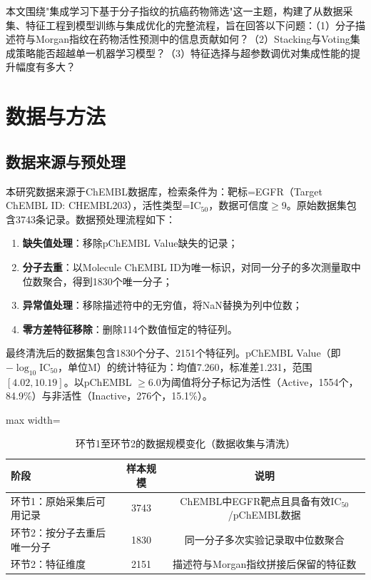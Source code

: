 \documentclass[12pt,a4paper]{article}
\begin{document}
本文围绕"集成学习下基于分子指纹的抗癌药物筛选"这一主题，构建了从数据采集、特征工程到模型训练与集成优化的完整流程，旨在回答以下问题：（1）分子描述符与Morgan指纹在药物活性预测中的信息贡献如何？（2）Stacking与Voting集成策略能否超越单一机器学习模型？（3）特征选择与超参数调优对集成性能的提升幅度有多大？

\section{数据与方法}

\subsection{数据来源与预处理}

本研究数据来源于ChEMBL数据库，检索条件为：靶标=EGFR（Target ChEMBL ID: CHEMBL203），活性类型=IC$_{50}$，数据可信度$\geq$9。原始数据集包含3743条记录。数据预处理流程如下：

\begin{enumerate}[leftmargin=2em]
    \item \textbf{缺失值处理}：移除pChEMBL Value缺失的记录；
    \item \textbf{分子去重}：以Molecule ChEMBL ID为唯一标识，对同一分子的多次测量取中位数聚合，得到1830个唯一分子；
    \item \textbf{异常值处理}：移除描述符中的无穷值，将NaN替换为列中位数；
    \item \textbf{零方差特征移除}：删除114个数值恒定的特征列。
\end{enumerate}

最终清洗后的数据集包含1830个分子、2151个特征列。pChEMBL Value（即$-\log_{10}\text{IC}_{50}$，单位M）的统计特征为：均值7.260，标准差1.231，范围$[4.02, 10.19]$。以pChEMBL $\geq 6.0$为阈值将分子标记为活性（Active，1554个，84.9\%）与非活性（Inactive，276个，15.1\%）。

\begin{table}[H]
\centering
\caption{环节1至环节2的数据规模变化（数据收集与清洗）}
\label{tab:phase1_dataflow}
\begin{adjustbox}{max width=\textwidth}
\begin{tabular}{lcc}
\toprule
阶段 & 样本规模 & 说明 \\
\midrule
环节1：原始采集后可用记录 & 3743 & ChEMBL中EGFR靶点且具备有效IC$_{50}$/pChEMBL数据 \\
环节2：按分子去重后唯一分子 & 1830 & 同一分子多次实验记录取中位数聚合 \\
环节2：特征维度 & 2151 & 描述符与Morgan指纹拼接后保留的特征数 \\
\bottomrule
\end{tabular}
\end{adjustbox}
\end{table}
\end{document}
